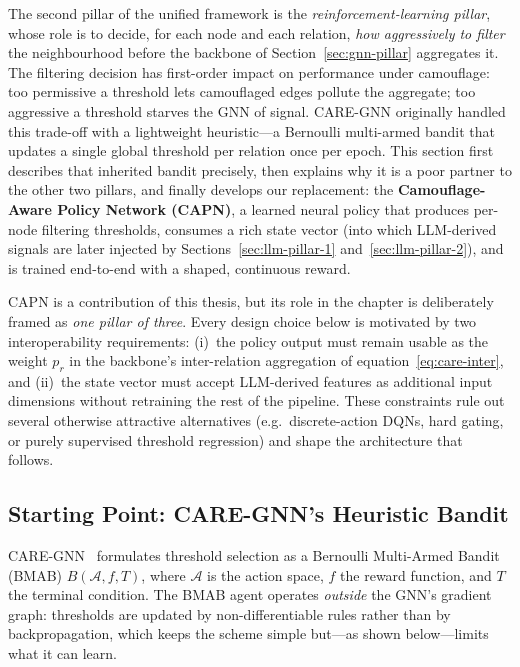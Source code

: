 The second pillar of the unified framework is the \emph{reinforcement-learning pillar}, whose role is to decide, for each node and each relation, \emph{how aggressively to filter} the neighbourhood before the backbone of Section~\ref{sec:gnn-pillar} aggregates it. The filtering decision has first-order impact on performance under camouflage: too permissive a threshold lets camouflaged edges pollute the aggregate; too aggressive a threshold starves the GNN of signal. CARE-GNN originally handled this trade-off with a lightweight heuristic---a Bernoulli multi-armed bandit that updates a single global threshold per relation once per epoch. This section first describes that inherited bandit precisely, then explains why it is a poor partner to the other two pillars, and finally develops our replacement: the \textbf{Camouflage-Aware Policy Network (CAPN)}, a learned neural policy that produces per-node filtering thresholds, consumes a rich state vector (into which LLM-derived signals are later injected by Sections~\ref{sec:llm-pillar-1} and~\ref{sec:llm-pillar-2}), and is trained end-to-end with a shaped, continuous reward.

CAPN is a contribution of this thesis, but its role in the chapter is deliberately framed as \emph{one pillar of three}. Every design choice below is motivated by two interoperability requirements: (i)~the policy output must remain usable as the weight $p_r$ in the backbone's inter-relation aggregation of equation~\eqref{eq:care-inter}, and (ii)~the state vector must accept LLM-derived features as additional input dimensions without retraining the rest of the pipeline. These constraints rule out several otherwise attractive alternatives (e.g.\ discrete-action DQNs, hard gating, or purely supervised threshold regression) and shape the architecture that follows.

\subsection{Starting Point: CARE-GNN's Heuristic Bandit}
\label{sec:inherited-bandit}
\label{sec:rl-module}

CARE-GNN~\cite{dou2020enhancing} formulates threshold selection as a Bernoulli Multi-Armed Bandit (BMAB) $B(\mathcal{A}, f, T)$, where $\mathcal{A}$ is the action space, $f$ the reward function, and $T$ the terminal condition. The BMAB agent operates \emph{outside} the GNN's gradient graph: thresholds are updated by non-differentiable rules rather than by backpropagation, which keeps the scheme simple but---as shown below---limits what it can learn.

